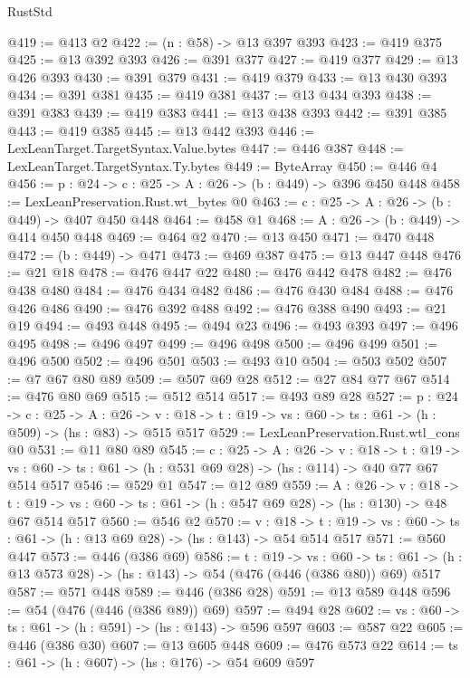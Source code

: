 \begin{lexlean}{RustStd}
\begin{coremodule}
{\begin{coremodule}
{{{{{{{@419 := @413 @2
@422 := (n : @58) -> @13 @397 @393
@423 := @419 @375
@425 := @13 @392 @393
@426 := @391 @377
@427 := @419 @377
@429 := @13 @426 @393
@430 := @391 @379
@431 := @419 @379
@433 := @13 @430 @393
@434 := @391 @381
@435 := @419 @381
@437 := @13 @434 @393
@438 := @391 @383
@439 := @419 @383
@441 := @13 @438 @393
@442 := @391 @385
@443 := @419 @385
@445 := @13 @442 @393
@446 := LexLeanTarget.TargetSyntax.Value.bytes
@447 := @446 @387
@448 := LexLeanTarget.TargetSyntax.Ty.bytes
@449 := ByteArray
@450 := @446 @4
@456 := {p : @24} -> {c : @25} -> {A : @26} -> (b : @449) -> @396 @450 @448
@458 := LexLeanPreservation.Rust.wt_bytes @0
@463 := {c : @25} -> {A : @26} -> (b : @449) -> @407 @450 @448
@464 := @458 @1
@468 := {A : @26} -> (b : @449) -> @414 @450 @448
@469 := @464 @2
@470 := @13 @450
@471 := @470 @448
@472 := (b : @449) -> @471
@473 := @469 @387
@475 := @13 @447 @448
@476 := @21 @18
@478 := @476 @447 @22
@480 := @476 @442 @478
@482 := @476 @438 @480
@484 := @476 @434 @482
@486 := @476 @430 @484
@488 := @476 @426 @486
@490 := @476 @392 @488
@492 := @476 @388 @490
@493 := @21 @19
@494 := @493 @448
@495 := @494 @23
@496 := @493 @393
@497 := @496 @495
@498 := @496 @497
@499 := @496 @498
@500 := @496 @499
@501 := @496 @500
@502 := @496 @501
@503 := @493 @10
@504 := @503 @502
@507 := @7 @67 @80 @89
@509 := @507 @69 @28
@512 := @27 @84 @77 @67
@514 := @476 @80 @69
@515 := @512 @514
@517 := @493 @89 @28
@527 := {p : @24} ->
  {c : @25} ->
  {A : @26} ->
  {v : @18} -> {t : @19} -> {vs : @60} -> {ts : @61} -> (h : @509) -> (hs : @83) -> @515 @517
@529 := LexLeanPreservation.Rust.wtl_cons @0
@531 := @11 @80 @89
@545 := {c : @25} ->
  {A : @26} ->
  {v : @18} ->
  {t : @19} ->
  {vs : @60} -> {ts : @61} -> (h : @531 @69 @28) -> (hs : @114) -> @40 @77 @67 @514 @517
@546 := @529 @1
@547 := @12 @89
@559 := {A : @26} ->
  {v : @18} ->
  {t : @19} -> {vs : @60} -> {ts : @61} -> (h : @547 @69 @28) -> (hs : @130) -> @48 @67 @514 @517
@560 := @546 @2
@570 := {v : @18} ->
  {t : @19} -> {vs : @60} -> {ts : @61} -> (h : @13 @69 @28) -> (hs : @143) -> @54 @514 @517
@571 := @560 @447
@573 := @446 (@386 @69)
@586 := {t : @19} ->
  {vs : @60} ->
  {ts : @61} -> (h : @13 @573 @28) -> (hs : @143) -> @54 (@476 (@446 (@386 @80)) @69) @517
@587 := @571 @448
@589 := @446 (@386 @28)
@591 := @13 @589 @448
@596 := @54 (@476 (@446 (@386 @89)) @69)
@597 := @494 @28
@602 := {vs : @60} -> {ts : @61} -> (h : @591) -> (hs : @143) -> @596 @597
@603 := @587 @22
@605 := @446 (@386 @30)
@607 := @13 @605 @448
@609 := @476 @573 @22
@614 := {ts : @61} -> (h : @607) -> (hs : @176) -> @54 @609 @597
}}}}}}}
\end{coremodule}}
\end{coremodule}
\end{lexlean}
